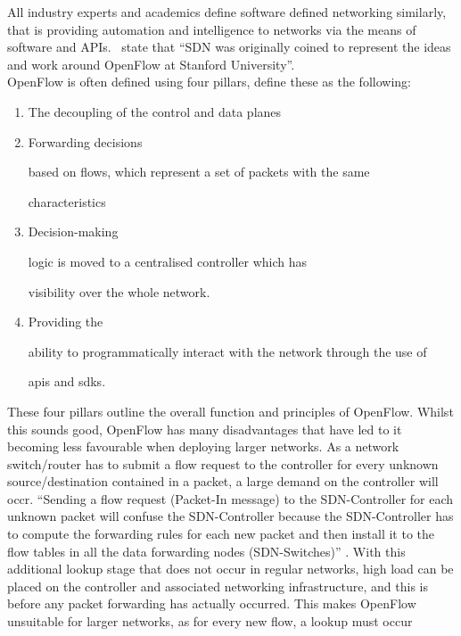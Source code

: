 All industry experts and academics define
software defined networking
similarly, that is providing automation and
intelligence to networks via the
means of software and APIs.~\citet{11} state
that ``SDN was originally coined
to represent the ideas and work around
OpenFlow at Stanford University''.\\
OpenFlow
is often defined using four
pillars, \citet{11} define these as the
following:
\begin{enumerate}

      \item
            The decoupling of the
            control and data planes

      \item
            Forwarding decisions

            based on flows, which
            represent a set of
            packets
            with
            the same

            characteristics
      \item
            Decision-making

            logic is moved to a centralised
            controller which
            has

            visibility over the whole network.
      \item Providing the

            ability to programmatically interact with the network through the use of

            \gls{api}s and \gls{sdk}s.
\end{enumerate}
These four pillars outline
the
overall function and principles of OpenFlow. Whilst this sounds good,
OpenFlow
has many disadvantages that have led to it becoming less favourable
when
deploying larger networks. As a network switch/router has to submit a flow
request to the controller for every unknown source/destination contained in a
packet, a large demand on the controller will occr. ``Sending a flow request
(Packet-In message) to the SDN-Controller for each unknown packet will confuse
the SDN-Controller because the SDN-Controller has to compute the forwarding
rules for each new packet and then install it to the flow tables in all the
data forwarding nodes (SDN-Switches)'' \citep{app11156999}. With this
additional lookup stage that does not occur in regular networks, high load can
be placed on the controller and associated networking infrastructure, and this
is before any packet forwarding has actually occurred. This makes OpenFlow
unsuitable for larger networks, as for every new flow, a lookup must occur
